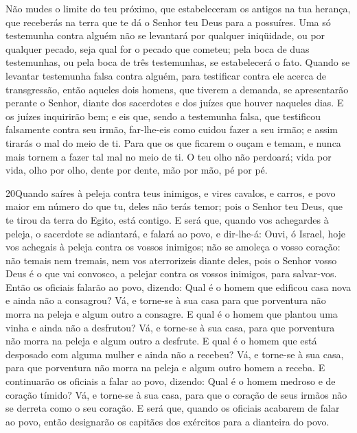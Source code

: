 Não mudes o limite do teu próximo, que estabeleceram os antigos
na tua herança, que receberás na terra que te dá o Senhor teu Deus
para a possuíres. Uma só testemunha contra alguém não se
levantará por qualquer iniqüidade, ou por qualquer pecado, seja qual
for o pecado que cometeu; pela boca de duas testemunhas, ou pela
boca de três testemunhas, se estabelecerá o fato. Quando se
levantar testemunha falsa contra alguém, para testificar contra ele
acerca de transgressão, então aqueles dois homens, que
tiverem a demanda, se apresentarão perante o Senhor, diante dos
sacerdotes e dos juízes que houver naqueles dias. E os juízes
inquirirão bem; e eis que, sendo a testemunha falsa, que testificou
falsamente contra seu irmão, far-lhe-eis como cuidou fazer a
seu irmão; e assim tirarás o mal do meio de ti. Para que os
que ficarem o ouçam e temam, e nunca mais tornem a fazer tal mal no
meio de ti. O teu olho não perdoará; vida por vida, olho por
olho, dente por dente, mão por mão, pé por pé.

\medskip

\lettrine{20} Quando saíres à peleja contra teus inimigos, e
vires cavalos, e carros, e povo maior em número do que tu, deles não
terás temor; pois o Senhor teu Deus, que te tirou da terra do Egito,
está contigo. E será que, quando vos achegardes à peleja, o
sacerdote se adiantará, e falará ao povo, e dir-lhe-á: Ouvi, ó
Israel, hoje vos achegais à peleja contra os vossos inimigos; não se
amoleça o vosso coração: não temais nem tremais, nem vos
aterrorizeis diante deles, pois o Senhor vosso Deus é o que vai
convosco, a pelejar contra os vossos inimigos, para salvar-vos.
Então os oficiais falarão ao povo, dizendo: Qual é o homem que
edificou casa nova e ainda não a consagrou? Vá, e torne-se à sua
casa para que porventura não morra na peleja e algum outro a
consagre. E qual é o homem que plantou uma vinha e ainda não a
desfrutou? Vá, e torne-se à sua casa, para que porventura não morra
na peleja e algum outro a desfrute. E qual é o homem que está
desposado com alguma mulher e ainda não a recebeu? Vá, e torne-se à
sua casa, para que porventura não morra na peleja e algum outro
homem a receba. E continuarão os oficiais a falar ao povo,
dizendo: Qual é o homem medroso e de coração tímido? Vá, e torne-se
à sua casa, para que o coração de seus irmãos não se derreta como o
seu coração. E será que, quando os oficiais acabarem de falar ao
povo, então designarão os capitães dos exércitos para a dianteira do
povo.

